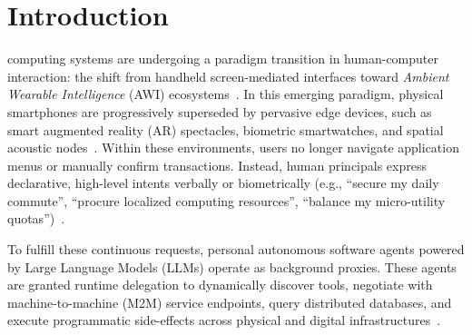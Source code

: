 \documentclass[journal]{IEEEtran}
\begin{document}
\IEEEpeerreviewmaketitle

\vfill\newpage

\section{Introduction}
\label{sec:intro}

 computing systems are undergoing a paradigm transition in human-computer interaction: the shift from handheld screen-mediated interfaces toward \emph{Ambient Wearable Intelligence} (AWI) ecosystems~\cite{sun2026survey}. In this emerging paradigm, physical smartphones are progressively superseded by pervasive edge devices, such as smart augmented reality (AR) spectacles, biometric smartwatches, and spatial acoustic nodes~\cite{wu2023autogen}. Within these environments, users no longer navigate application menus or manually confirm transactions. Instead, human principals express declarative, high-level intents verbally or biometrically (e.g., ``secure my daily commute'', ``procure localized computing resources'', ``balance my micro-utility quotas'')~\cite{qin2024toolllm}.

To fulfill these continuous requests, personal autonomous software agents powered by Large Language Models (LLMs) operate as background proxies. These agents are granted runtime delegation to dynamically discover tools, negotiate with machine-to-machine (M2M) service endpoints, query distributed databases, and execute programmatic side-effects across physical and digital infrastructures~\cite{liu2024agentbench}.
\end{document}

